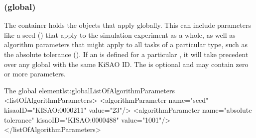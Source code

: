 \begin{blockChanged}
\subsubsection{ (global)}
\label{class:globalListOfAlgorithmParameters}
The  container holds the \AlgorithmParameter objects that apply globally.  This can include parameters like a seed () that apply to the simulation experiment as a whole, as well as algorithm parameters that might apply to all tasks of a particular type, such as the absolute tolerance ().  If an \AlgorithmParameter is defined for a particular \Simulation, it will take precedent over any global \AlgorithmParameter with the same KiSAO ID.  The  is optional and may contain zero or more parameters.

\begin{myXmlLst}{The global  element}{lst:globalListOfAlgorithmParameters}
<listOfAlgorithmParameters>
	<algorithmParameter name="seed" kisaoID="KISAO:0000211" value="23"/> 
	<algorithmParameter name="absolute tolerance" kisaoID="KISAO:0000488" value="1001"/> 
</listOfAlgorithmParameters>
\end{myXmlLst}
\end{blockChanged}
